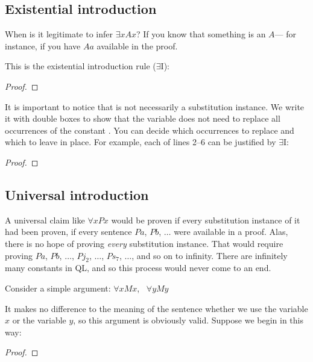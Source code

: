 \subsection{Existential introduction}

When is it legitimate to infer $\exists x Ax$? If you know that something is an $A$--- for instance, if you have $Aa$ available in the proof.

This is the existential introduction rule ($\exists$I):

\begin{proof}
	 
\end{proof}

It is important to notice that \metaA{} is not necessarily a substitution instance. We write it with double boxes to show that the variable  does not need to replace all occurrences of the constant . You can decide which occurrences to replace and which to leave in place. For example, each of lines 2--6 can be justified by $\exists${}I:


\begin{proof}
	 
	 
	 
	 
	 
\end{proof}


\subsection{Universal introduction}
A universal claim like $\forall x Px$ would be proven if {every} substitution instance of it had been proven, if every sentence $Pa$, $Pb$, $\ldots$ were available in a proof. Alas, there is no hope of proving \emph{every} substitution instance. That would require proving $Pa$, $Pb$, $\ldots$, $Pj_2$, $\ldots$, $Ps_7$, $\ldots$, and so on to infinity. There are infinitely many constants in QL, and so this process would never come to an end.

Consider a simple argument: $\forall x Mx$, \therefore\ $\forall y My$

It makes no difference to the meaning of the sentence whether we use the variable $x$ or the variable $y$, so this argument is obviously valid. Suppose we begin in this way:

\begin{proof}
	 
	 
\end{proof}

